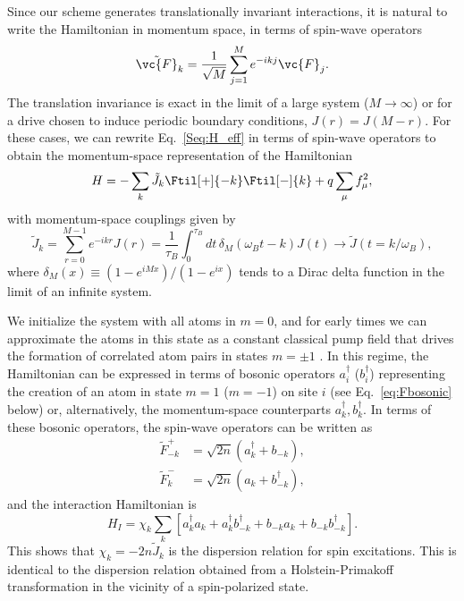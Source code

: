 \begin{bibunit}
Since our scheme generates translationally invariant interactions, it is natural to write the Hamiltonian in momentum space, in terms of spin-wave operators
\begin{equation}
\tilde{\vc{F}}_k = \frac{1}{\sqrt{M}}\sum_{j=1}^M e^{-i k j} \vc{F}_j.
\end{equation}
The translation invariance is exact in the limit of a large system ($M\rightarrow \infty$) or for a drive chosen to induce periodic boundary conditions, $J(r) = J(M-r)$.  For these cases, we can rewrite Eq.~\eqref{Seq:H_eff} in terms of spin-wave operators to obtain the momentum-space representation of the Hamiltonian
\begin{equation}
H = -\sum_{k}\tilde{J}_k \Ftil[+]{-k} \Ftil[-]{k} + q\sum_\mu f_\mu^2,
\end{equation}
with momentum-space couplings given by
\begin{equation}
\tilde{J}_k = \sum_{r=0}^{M-1} e^{-i k r} J(r) = \frac{1}{\tau_B}\int_0^{\tau_B}dt\, \delta_M(\omega_B t - k) J(t) \rightarrow \tilde{J}(t = k/\omega_B),
\end{equation}
where $\delta_M(x) \equiv (1-e^{iMx})/({1-e^{ix}})$ tends to a Dirac delta function in the limit of an infinite system.

We initialize the system with all atoms in $m=0$, and for early times we can approximate the atoms in this state as a constant classical pump field that drives the formation of correlated atom pairs in states $m=\pm 1$ \cite{davis2019photon}.  In this regime, the Hamiltonian can be expressed in terms of bosonic operators $a^\dagger_i$ ($b^\dagger_i$) representing the creation of an atom in state $m=1$ ($m=-1$) on site $i$ (see Eq.~\ref{eq:Fbosonic} below) or, alternatively, the momentum-space counterparts $a^\dagger_k, b^\dagger_k$.  In terms of these bosonic operators, the spin-wave operators can be written as
\begin{equation}
\begin{aligned}
\tilde{F}_{-k}^+ &= \sqrt{2n} \left(a_k^\dagger + b_{-k} \right), \\
\tilde{F}_k^- &= \sqrt{2n} \left(a_k + b_{-k}^\dagger \right),
\end{aligned}
\end{equation}
and the interaction Hamiltonian is
\begin{equation}
    H_I = \chi_k \sum_k [a_k^\dagger a_k + a_k^\dagger b_{-k}^\dagger + b_{-k}a_k + b_{-k}b_{-k}^\dagger].
\end{equation}
This shows that $\chi_k = -2n\tilde{J}_k$ is the dispersion relation for spin excitations. This is identical to the dispersion relation obtained from a Holstein-Primakoff transformation in the vicinity of a spin-polarized state. 


\end{bibunit}
